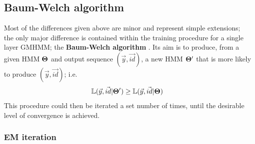 \documentclass[12pt,a4paper,twoside,openright]{report}
\begin{document}
\subsection{Baum-Welch algorithm}\label{secbaumwelch}

Most of the differences given above are minor and represent simple extensions; the only major difference is contained within the training procedure for a single layer GMHMM; the {\bf Baum-Welch algorithm} \cite{rabiner1989tutorial}. Its aim is to produce, from a given HMM $\bf\Theta$ and output sequence $(\vec{y}, \vec{id})$, a new HMM $\bf\Theta'$ that is more likely to produce $(\vec{y}, \vec{id})$; i.e.
\[\mathbb{L}(\vec{y}, \vec{id}|{\bf \Theta'}) \geq \mathbb{L}(\vec{y}, \vec{id}|{\bf \Theta})\]
This procedure could then be iterated a set number of times, until the desirable level of convergence is achieved.

\subsubsection{EM iteration}\label{secemiter}
\end{document}
